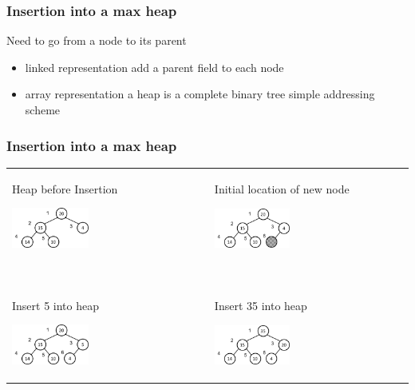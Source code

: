 \documentclass[newPxFont,sthlmFooter,nooffset]{beamer}
\begin{document}
\begin{frame}[t]
  \frametitle{Insertion into a max heap}
Need to go from a node to its parent
\begin{itemize}
\item linked representation add a parent field to each node
  \item array representation a heap is a complete binary tree simple
    addressing scheme
\end{itemize}
\end{frame}


\begin{frame}[t]
  \frametitle{Insertion into a max heap}
  \begin{tabular}{p{} p{}}
Heap before Insertion

    \includegraphics[width=0.4\textwidth]{./figures/fig13_heap_insert.png}
&    
  Initial location of new node

    \includegraphics[width=0.4\textwidth]{./figures/fig13_heap_insert1.png}
\pause \\
~& ~\\
Insert 5 into heap

    \includegraphics[width=0.4\textwidth]{./figures/fig13_heap_insert2.png}
&
Insert 35 into heap

    \includegraphics[width=0.4\textwidth]{./figures/fig13_heap_insert3.png}
\\
  \end{tabular}
\end{frame}
\end{document}
